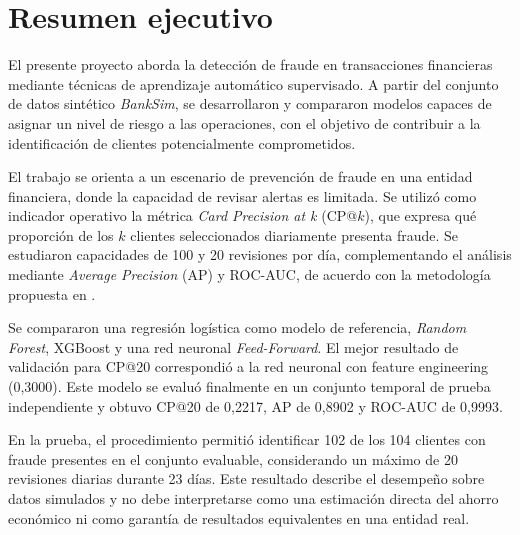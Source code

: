 \section{Resumen ejecutivo}

El presente proyecto aborda la detección de fraude en transacciones financieras mediante técnicas de aprendizaje automático supervisado. A partir del conjunto de datos sintético \textit{BankSim}, se desarrollaron y compararon modelos capaces de asignar un nivel de riesgo a las operaciones, con el objetivo de contribuir a la identificación de clientes potencialmente comprometidos.

El trabajo se orienta a un escenario de prevención de fraude en una entidad financiera, donde la capacidad de revisar alertas es limitada. Se utilizó como indicador operativo la métrica \textit{Card Precision at k} (CP@$k$), que expresa qué proporción de los $k$ clientes seleccionados diariamente presenta fraude. Se estudiaron capacidades de 100 y 20 revisiones por día, complementando el análisis mediante \textit{Average Precision} (AP) y ROC-AUC, de acuerdo con la metodología propuesta en \cite{leborgne2022fraud}.

Se compararon una regresión logística como modelo de referencia, \textit{Random Forest}, XGBoost y una red neuronal \textit{Feed-Forward}. El mejor resultado de validación para CP@20 correspondió a la red neuronal con feature engineering (0,3000). Este modelo se evaluó finalmente en un conjunto temporal de prueba independiente y obtuvo CP@20 de 0,2217, AP de 0,8902 y ROC-AUC de 0,9993.

En la prueba, el procedimiento permitió identificar 102 de los 104 clientes con fraude presentes en el conjunto evaluable, considerando un máximo de 20 revisiones diarias durante 23 días. Este resultado describe el desempeño sobre datos simulados y no debe interpretarse como una estimación directa del ahorro económico ni como garantía de resultados equivalentes en una entidad real.
